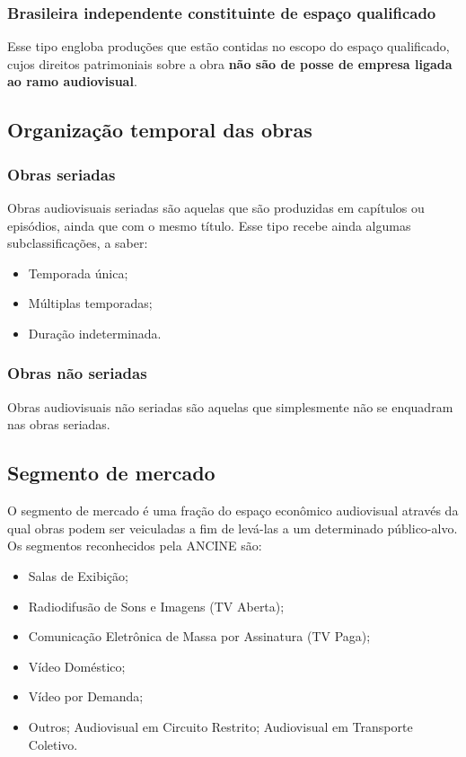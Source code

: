 \documentclass[portuguese,12pt,a4paper]{article}
\begin{document}
	\subsubsection{Brasileira independente constituinte de espaço qualificado}
	Esse tipo engloba produções que estão contidas no escopo do espaço qualificado, cujos direitos patrimoniais sobre a obra \textbf{não são de posse de empresa ligada ao ramo audiovisual}.
	
	\subsection{Organização temporal das obras}
	\subsubsection{Obras seriadas}
	Obras audiovisuais seriadas são aquelas que são produzidas em capítulos ou episódios, ainda que com o mesmo título. Esse tipo recebe ainda algumas subclassificações, a saber:
	\begin{itemize}
		\item Temporada única;
		\item Múltiplas temporadas;
		\item Duração indeterminada.
	\end{itemize}
	\subsubsection{Obras não seriadas}
	Obras audiovisuais não seriadas são aquelas que simplesmente não se enquadram nas obras seriadas.
	
	\subsection{Segmento de mercado}
	O segmento de mercado é uma fração do espaço econômico audiovisual através da qual obras podem ser veiculadas a fim de levá-las a um determinado público-alvo. Os segmentos reconhecidos pela ANCINE são:
	\begin{itemize}
		\item Salas de Exibição;
		\item Radiodifusão de Sons e Imagens (TV Aberta);
		\item Comunicação Eletrônica de Massa por Assinatura (TV Paga);
		\item Vídeo Doméstico;
		\item Vídeo por Demanda;
		\item Outros;
		\subitem Audiovisual em Circuito Restrito;
		\subitem Audiovisual em Transporte Coletivo.
	\end{itemize}
	
	
	
\end{document}
